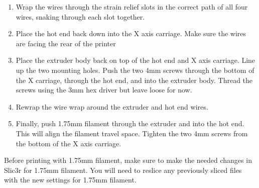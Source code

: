 \begin{enumerate}
\item Wrap the wires through the strain relief slots in the correct path of all four wires, snaking through each slot together.
\item Place the hot end back down into the X axis carriage. Make sure the wires are facing the rear of the printer
\item Place the extruder body back on top of the hot end and X axis carriage. Line up the two mounting holes. Push the two 4mm screws through the bottom of the X carriage, through the hot end, and into the extruder body. Thread the screws using the 3mm hex driver but leave loose for now.
\item Rewrap the wire wrap around the extruder and hot end wires.
\item Finally, push 1.75mm filament through the extruder and into the hot end. This will align the filament travel space. Tighten the two 4mm screws from the bottom of the X axis carriage.
\end{enumerate}

Before printing with 1.75mm filament, make sure to make the needed changes in Slic3r for 1.75mm filament. You will need to reslice any previously sliced files with the new settings for 1.75mm filament.
